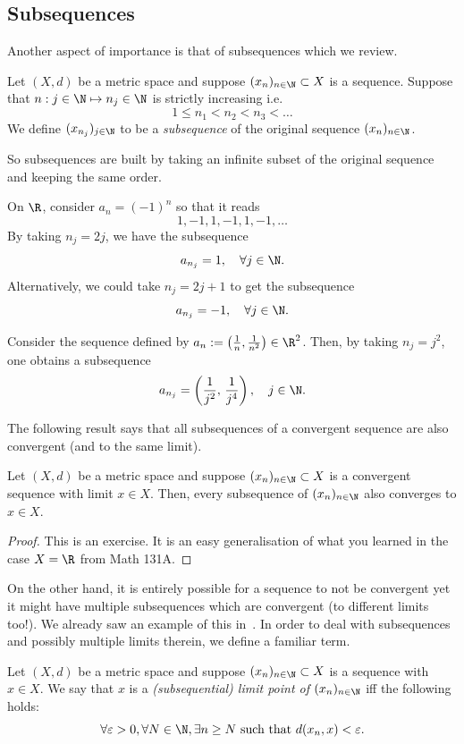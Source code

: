 \subsection{Subsequences}
\label{sec:subseq}
Another aspect of importance is that of subsequences which we review.
\begin{defn}[Subsequences]
Let $(X,d)$ be a metric space and suppose $(x_n)_{n\in \N}\subset X$ is a sequence. Suppose that $n: j\in \N \mapsto n_j \in \N$ is strictly increasing i.e.
\[
1 \le n_1 < n_2 < n_3 < \dots
\]
We define $(x_{n_j})_{j\in\N}$ to be a \textit{subsequence} of the original sequence $(x_n)_{n\in\N}$.
\end{defn}
So subsequences are built by taking an infinite subset of the original sequence and keeping the same order.
\begin{eg}
\label{eg:seq_alt}
On $\R$, consider $a_n = (-1)^n$ so that it reads
\[
1,-1,1,-1,1,-1,\dots
\]
By taking $n_j = 2j$, we have the subsequence
\[
a_{n_j} = 1,\quad \forall j\in\N.
\]
Alternatively, we could take $n_j = 2j+1$ to get the subsequence
\[
a_{n_j} = -1,\quad \forall j\in\N.
\]
\end{eg}
\begin{eg}
Consider the sequence defined by $a_n := \left(\frac{1}{n},\frac{1}{n^2}\right)\in \R^2$. Then, by taking $n_j = j^2$, one obtains a subsequence
\[
a_{n_j} = \left(\frac{1}{j^2},\, \frac{1}{j^4}\right),\quad j\in \N.
\]
\end{eg}
The following result says that all subsequences of a convergent sequence are also convergent (and to the same limit).
\begin{lemma}
\label{lem:cvg_imp_sub_cvg}
Let $(X,d)$ be a metric space and suppose $(x_n)_{n\in\N}\subset X$ is a convergent sequence with limit $x\in X$. Then, every subsequence of $(x_n)_{n\in\N}$ also converges to $x\in X$.
\end{lemma}
\begin{proof}
This is an exercise. It is an easy generalisation of what you learned in the case $X = \R$ from Math 131A.
\end{proof}
On the other hand, it is entirely possible for a sequence to not be convergent yet it might have multiple subsequences which are convergent (to different limits too!). We already saw an example of this in~. In order to deal with subsequences and possibly multiple limits therein, we define a familiar term.
\begin{defn}
\label{defn:subseq_lim}
Let $(X,d)$ be a metric space and suppose $(x_n)_{n\in\N}\subset X$ is a sequence with $x\in X$. We say that $x$ is a \textit{(subsequential) limit point of $(x_n)_{n\in\N}$} iff the following holds:
\[
\forall \varepsilon>0,\forall N\in\N, \exists n\ge N\text{ such that }d(x_n,x)<\varepsilon.
\]
\end{defn}

